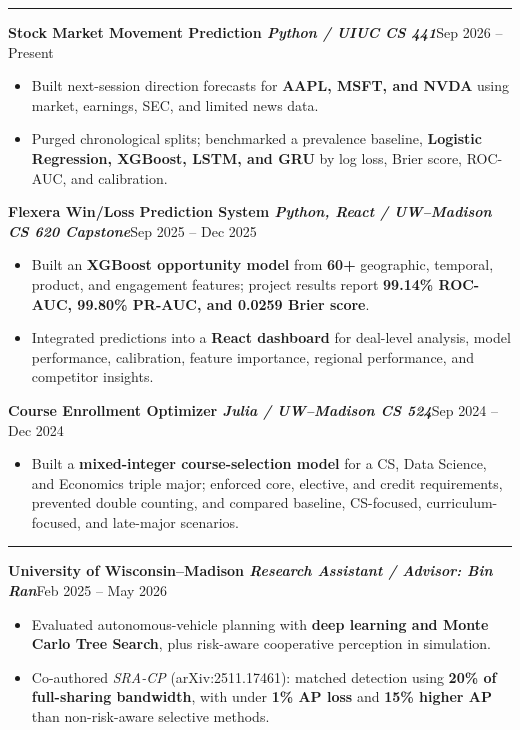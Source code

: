 \documentclass[10pt]{article}
\newcommand{\ressection}[1]{\vspace{4pt}{\normalsize\bfseries #1}\par\vspace{4pt}\hrule\vspace{5pt}}
\newcommand{\entry}[3]{\textbf{#1}\hfill {#2}\par\if\relax\detokenize{#3}\relax\vspace{-2pt}\else{\fontsize{9}{11.5}\selectfont\textit{#3}\par}\fi}
\newenvironment{tightitems}{\setlength{\leftmargini}{1.4em}\begin{itemize}\setlength{\itemsep}{0pt}\setlength{\topsep}{1pt}\setlength{\partopsep}{0pt}\setlength{\parsep}{0pt}\setlength{\parskip}{0pt}}{\end{itemize}\vspace{-1pt}}
\begin{document}
\ressection{Project}
\entry{Stock Market Movement Prediction \normalfont\textit{Python / UIUC CS 441}}{Sep 2026 -- Present}{}
\begin{tightitems}
  \item Built next-session direction forecasts for \textbf{AAPL, MSFT, and NVDA} using market, earnings, SEC, and limited news data.
  \item Purged chronological splits; benchmarked a prevalence baseline, \textbf{Logistic Regression, XGBoost, LSTM, and GRU} by log loss, Brier score, ROC-AUC, and calibration.
\end{tightitems}
\entry{Flexera Win/Loss Prediction System \normalfont\textit{Python, React / UW--Madison CS 620 Capstone}}{Sep 2025 -- Dec 2025}{}
\begin{tightitems}
  \item Built an \textbf{XGBoost opportunity model} from \textbf{60+} geographic, temporal, product, and engagement features; project results report \textbf{99.14\% ROC-AUC, 99.80\% PR-AUC, and 0.0259 Brier score}.
  \item Integrated predictions into a \textbf{React dashboard} for deal-level analysis, model performance, calibration, feature importance, regional performance, and competitor insights.
\end{tightitems}
\entry{Course Enrollment Optimizer \normalfont\textit{Julia / UW--Madison CS 524}}{Sep 2024 -- Dec 2024}{}
\begin{tightitems}
  \item Built a \textbf{mixed-integer course-selection model} for a CS, Data Science, and Economics triple major; enforced core, elective, and credit requirements, prevented double counting, and compared baseline, CS-focused, curriculum-focused, and late-major scenarios.
\end{tightitems}
\ressection{Research}
\entry{University of Wisconsin--Madison \normalfont\textit{Research Assistant / Advisor: Bin Ran}}{Feb 2025 -- May 2026}{}
\begin{tightitems}
  \item Evaluated autonomous-vehicle planning with \textbf{deep learning and Monte Carlo Tree Search}, plus risk-aware cooperative perception in simulation.
  \item Co-authored \emph{SRA-CP} (arXiv:2511.17461): matched detection using \textbf{20\% of full-sharing bandwidth}, with under \textbf{1\% AP loss} and \textbf{15\% higher AP} than non-risk-aware selective methods.
\end{tightitems}
\end{document}
